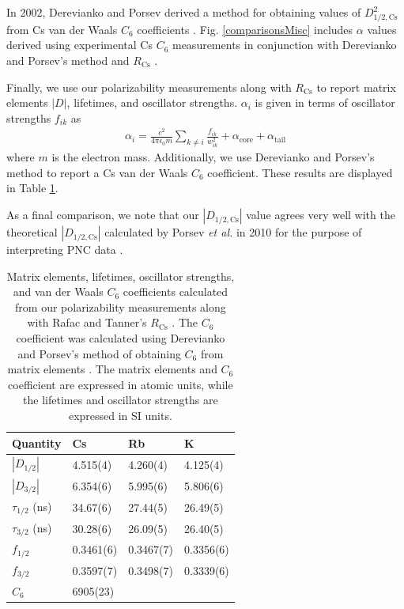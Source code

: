 \documentclass[twocolumn,prl,showpacs,superscriptaddress]{revtex4-1}   %
\newcommand{\figref}[1]{Fig. \ref{#1}}
\newcommand{\acore}{\alpha_{\textrm{core}}}
\newcommand{\atail}{\alpha_{\textrm{tail}}}
\newcommand{\rcs}{R_{\mathrm{Cs}}}
\newcommand{\etal}{\textit{et al. }}
\begin{document}
In 2002, Derevianko and Porsev derived a method for obtaining values of $D_{1/2,\mathrm{Cs}}^2$ from Cs van der Waals $C_6$ coefficients \cite{Derevianko2001}. \figref{comparisonsMisc} includes $\alpha$ values derived using experimental Cs $C_6$ measurements in conjunction with Derevianko and Porsev's method and $\rcs$ \cite{Leo2000,Chin2004,Derevianko2001,Rafac1998}.

Finally, we use our polarizability measurements along with $\rcs$ to report matrix elements $|D|$, lifetimes, and oscillator strengths. $\alpha_i$ is given in terms of oscillator strengths $f_{ik}$ as 
\begin{align}
	\alpha_i = \frac{e^2}{4 \pi \epsilon_0 m}
	\sum_{k \neq i}
	\frac{f_{ik}}{w_{ik}^2}
	+ \acore
	+ \atail
	\label{polFromOscStr}
\end{align}
where $m$ is the electron mass.
Additionally, we use Derevianko and Porsev's method to report a Cs van der Waals $C_6$ coefficient. These results are displayed in Table \ref{tableMisc}. 

As a final comparison, we note that our $\left|D_{1/2,\mathrm{Cs}}\right|$ value agrees very well with the theoretical $\left|D_{1/2,\mathrm{Cs}}\right|$ calculated by Porsev \etal in 2010 for the purpose of interpreting PNC data \cite{Porsev2010}.

\begingroup
\begin{table}
\caption{\label{tableMisc}Matrix elements, lifetimes, oscillator strengths, and van der Waals $C_6$ coefficients calculated from our polarizability measurements along with Rafac and Tanner's $R_{\mathrm{Cs}}$ \cite{Rafac1998}. The $C_6$ coefficient was calculated using Derevianko and Porsev's method of obtaining $C_6$ from matrix elements \cite{Derevianko2001}. The matrix elements and $C_6$ coefficient are expressed in atomic units, while the lifetimes and oscillator strengths are expressed in SI units.}
\begin{center}
\begin{tabular}{l l l l}
\hline\hline
Quantity & Cs & Rb & K \\
\hline
$\left|D_{1/2}\right|$	& 4.515(4) & 4.260(4) & 4.125(4) \\
$\left|D_{3/2}\right|$	& 6.354(6) & 5.995(6) & 5.806(6) \\
$\tau_{1/2}$ (ns)		& 34.67(6) & 27.44(5) & 26.49(5) \\
$\tau_{3/2}$ (ns)		& 30.28(6) & 26.09(5) & 26.40(5) \\
$f_{1/2}$				& 0.3461(6) & 0.3467(7) & 0.3356(6) \\
$f_{3/2}$				& 0.3597(7) & 0.3498(7) & 0.3339(6) \\
$C_6$					& 6905(23) & & \\
\hline\hline
\end{tabular}
\end{center}
\end{table}
\endgroup
\end{document}
